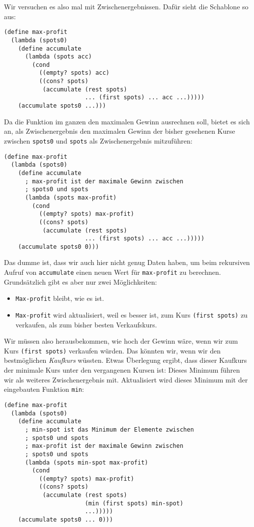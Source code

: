 Wir versuchen es also mal mit Zwischenergebnissen.  Dafür sieht die
Schablone so aus:
%
\begin{lstlisting}
(define max-profit
  (lambda (spots0)
    (define accumulate
      (lambda (spots acc)
        (cond
          ((empty? spots) acc)
          ((cons? spots)
           (accumulate (rest spots)
                       ... (first spots) ... acc ...)))))
    (accumulate spots0 ...)))
\end{lstlisting}
%
Da die Funktion im ganzen den maximalen Gewinn ausrechnen soll, bietet
es sich an, als Zwischenergebnis den maximalen Gewinn der bisher
gesehenen Kurse zwischen \lstinline{spots0} und \lstinline{spots} als
Zwischenergebnis mitzuführen:
%
\begin{lstlisting}
(define max-profit
  (lambda (spots0)
    (define accumulate
      ; max-profit ist der maximale Gewinn zwischen
      ; spots0 und spots
      (lambda (spots max-profit)
        (cond
          ((empty? spots) max-profit)
          ((cons? spots)
           (accumulate (rest spots)
                       ... (first spots) ... acc ...)))))
    (accumulate spots0 0)))
\end{lstlisting}
%
Das dumme ist, dass wir auch hier nicht genug Daten haben, um beim
rekursiven Aufruf von \lstinline{accumulate} einen neuen Wert für
\lstinline{max-profit} zu berechnen.  Grundsätzlich gibt es aber nur
zwei Möglichkeiten:
%
\begin{itemize}
\item \lstinline{Max-profit} bleibt, wie es ist.
\item \lstinline{Max-profit} wird aktualisiert, weil es besser ist,
  zum Kurs \lstinline{(first spots)} zu verkaufen, als zum bisher
  besten Verkaufskurs.
\end{itemize}
%
Wir müssen also herausbekommen, wie hoch der Gewinn wäre, wenn wir zum
Kurs \lstinline{(first spots)} verkaufen würden.  Das könnten wir,
wenn wir den bestmöglichen \emph{Kaufkurs} wüssten.  Etwas Überlegung
ergibt, dass dieser Kaufkurs der minimale Kurs unter den vergangenen
Kursen ist: Dieses Minimum führen wir als weiteres Zwischenergebnis
mit.  Aktualisiert wird dieses Minimum mit der eingebauten Funktion
\lstinline{min}:
%
\begin{lstlisting}
(define max-profit
  (lambda (spots0)
    (define accumulate
      ; min-spot ist das Minimum der Elemente zwischen
      ; spots0 und spots
      ; max-profit ist der maximale Gewinn zwischen
      ; spots0 und spots
      (lambda (spots min-spot max-profit)
        (cond
          ((empty? spots) max-profit)
          ((cons? spots)
           (accumulate (rest spots)
                       (min (first spots) min-spot)
                       ...)))))
    (accumulate spots0 ... 0)))
\end{lstlisting}
